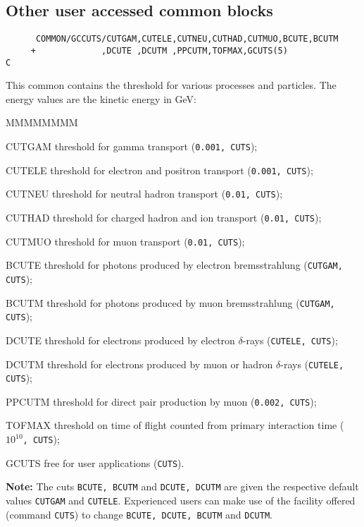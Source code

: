 \subsection{Other user accessed common blocks}
\begin{verbatim}
      COMMON/GCCUTS/CUTGAM,CUTELE,CUTNEU,CUTHAD,CUTMUO,BCUTE,BCUTM
     +             ,DCUTE ,DCUTM ,PPCUTM,TOFMAX,GCUTS(5)
C
\end{verbatim}
This common contains the threshold for various processes and particles.
The energy values are the kinetic energy in GeV:
\begin{DLtt}{MMMMMMMM}
\item[CUTGAM]    threshold for gamma transport
({\tt 0.001, CUTS});
\item[CUTELE]    threshold for electron and positron transport
({\tt 0.001, CUTS});
\item[CUTNEU]    threshold for neutral hadron transport
({\tt 0.01, CUTS});
\item[CUTHAD]    threshold for charged hadron and ion transport
({\tt 0.01, CUTS});
\item[CUTMUO]    threshold for muon transport
({\tt 0.01, CUTS});
\item[BCUTE]     threshold for photons produced by electron
                 bremsstrahlung ({\tt CUTGAM, CUTS});
\item[BCUTM]    threshold for photons produced by muon bremsstrahlung
({\tt CUTGAM, CUTS});
\item[DCUTE]   threshold for electrons produced by electron $\delta$-rays
({\tt CUTELE, CUTS});
\item[DCUTM]  threshold for electrons produced by muon or hadron $\delta$-rays
({\tt CUTELE, CUTS});
\item[PPCUTM] threshold for \Pep\Pem direct pair production by
              muon ({\tt 0.002, CUTS});
\item[TOFMAX]  threshold on time of flight counted
from primary interaction time ({\tt $10^{10}$, CUTS});
\item[GCUTS]   free for user applications   ({\tt CUTS}).
\end{DLtt}
{\bf Note:}
The cuts {\tt BCUTE, BCUTM} and {\tt DCUTE, DCUTM} are given
the respective default values {\tt CUTGAM} and {\tt CUTELE}.
Experienced
users can make use of the facility offered (command {\tt CUTS})
to change {\tt BCUTE, DCUTE, BCUTM} and {\tt DCUTM}.
 
